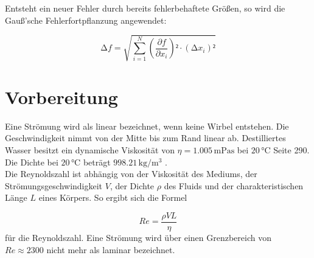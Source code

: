   \noindent
  Entsteht ein neuer Fehler durch bereits fehlerbehaftete Größen, so wird die Gauß'sche Fehlerfortpflanzung angewendet:
  
  \begin{equation}
  \label{eqn:Fehlerfortpflanzung}
      \increment f = \sqrt{\sum_{i=1}^N \left(\frac{\partial f}{\partial x_i}\right)²\cdot\left(\increment x_i\right)²}
  \end{equation}
  
  \section{Vorbereitung}
  Eine Strömung wird als linear bezeichnet, wenn keine Wirbel entstehen. Die Geschwindigkeit nimmt von der Mitte bis zum Rand linear ab.
  Destilliertes Wasser besitzt ein dynamische Viskosität von $\eta = 1.005\, \unit{\milli \pascal \second}$ bei $20\, \unit{\celsius}$ 
  \cite{Physikalisches_Praktikum} Seite 290. Die Dichte bei $20\, \unit{\celsius}$ beträgt $998.21\, \unit{\kilo \gram \per \cubic \meter}$
  \cite{Physikalisches_Praktikum}.\\
  \noindent
  Die Reynoldszahl ist abhängig von der Viskosität des Mediums, der Strömungsgeschwindigkeit $V$, der Dichte $\rho$ des Fluids und der 
  charakteristischen Länge $L$ eines Körpers. So ergibt sich die Formel 
  
  \begin{equation}
      Re = \frac{\rho V L}{\eta}
      \label{eqn:Reynolds}
  \end{equation}
  für die Reynoldszahl. Eine Strömung wird über einen Grenzbereich von $Re \approx 2300$ nicht mehr als laminar bezeichnet.

%

